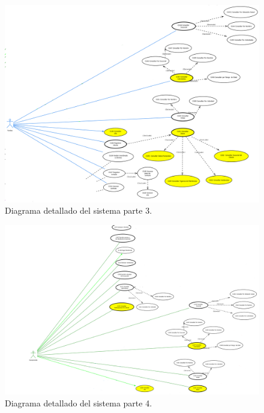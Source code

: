 \begin{figure}[htbp]
	\begin{center}
		\includegraphics[angle=90, width=.8\textwidth]{images/cu/3Ventas}
		\caption{Diagrama detallado del sistema parte 3.}
		\label{fig:CUcompleto2}
	\end{center}
\end{figure}

\begin{figure}[htbp]
	\begin{center}
		\includegraphics[angle=90, width=.8\textwidth]{images/cu/4Recepcionista}
		\caption{Diagrama detallado del sistema parte 4.}
		\label{fig:CUcompleto2}
	\end{center}
\end{figure}

